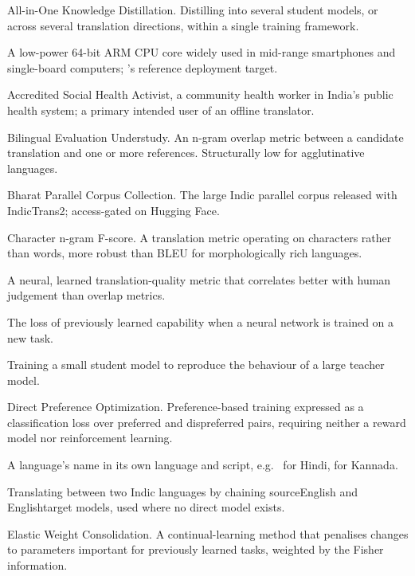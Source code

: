 \clearpage
\thispagestyle{plain}

{
\begin{terms}
\item[AIO-KD] All-in-One Knowledge Distillation. Distilling into several student models, or across several translation directions, within a single training framework.
\item[ARM Cortex-A55] A low-power 64-bit ARM CPU core widely used in mid-range smartphones and single-board computers; \setu{}'s reference deployment target.
\item[ASHA worker] Accredited Social Health Activist, a community health worker in India's public health system; a primary intended user of an offline translator.
\item[BLEU] Bilingual Evaluation Understudy. An n-gram overlap metric between a candidate translation and one or more references. Structurally low for agglutinative languages.
\item[BPCC] Bharat Parallel Corpus Collection. The large Indic parallel corpus released with IndicTrans2; access-gated on Hugging Face.
\item[chrF] Character n-gram F-score. A translation metric operating on characters rather than words, more robust than BLEU for morphologically rich languages.
\item[COMET] A neural, learned translation-quality metric that correlates better with human judgement than overlap metrics.
\item[Catastrophic forgetting] The loss of previously learned capability when a neural network is trained on a new task.
\item[Distillation] Training a small student model to reproduce the behaviour of a large teacher model.
\item[DPO] Direct Preference Optimization. Preference-based training expressed as a classification loss over preferred and dispreferred pairs, requiring neither a reward model nor reinforcement learning.
\item[Endonym] A language's name in its own language and script, e.g.\  for Hindi,  for Kannada.
\item[English pivot] Translating between two Indic languages by chaining source\arrowto{}English and English\arrowto{}target models, used where no direct model exists.
\item[EWC] Elastic Weight Consolidation. A continual-learning method that penalises changes to parameters important for previously learned tasks, weighted by the Fisher information.

\end{terms}}
